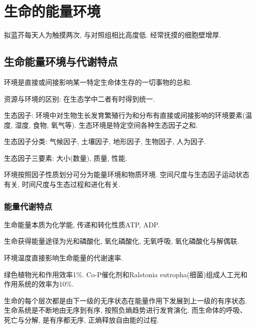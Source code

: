 \documentclass{ctexart}
\begin{document}
\section{生命的能量环境} %
\label{sec:生命的能量环境}

\begin{ex}[影响植物能量重新分配的实验]
    拟蓝芥每天人为触摸两次, 与对照组相比高度低. 经常抚摸的细胞壁增厚.
\end{ex}

\subsection{生命能量环境与代谢特点} %
\label{sub:生命能量环境与代谢特点}

环境是直接或间接影响某一特定生命体生存的一切事物的总和.
\par
资源与环境的区别: 在生态学中二者有时得到统一.
\par
生态因子: 环境中对生物生长发育繁殖行为和分布有直接或间接影响的环境要素(温度, 湿度, 食物, 氧气等). 生态环境是特定空间各种生态因子之和.
\par
生态因子分类: 气候因子, 土壤因子, 地形因子, 生物因子, 人为因子.
\par
生态因子三要素: 大小(数量), 质量, 性能.
\par
环境按照因子性质划分可分为能量环境和物质环境. 空间尺度与生态因子运动状态有关, 时间尺度与生态过程和进化有关.

\subsubsection{能量代谢特点} %
\label{ssub:能量代谢特点}

\begin{cenum}
    \item 生命能量本质为化学能, 传递和转化性质ATP, ADP.
    \item 生命获得能量途径为光和磷酸化, 氧化磷酸化, 无氧呼吸, 氧化磷酸化与解偶联.
    \item 环境温度直接影响生命能量的代谢速率.
    \item 绿色植物光和作用效率1\%. Co-P催化剂和Ralstonia eutropha(细菌)组成人工光和作用系统的效率为10\%.
\end{cenum}
\begin{remark}
    生命的每个层次都是由下一级的无序状态在能量作用下发展到上一级的有序状态. 生命系统是不断地由无序到有序, 按照负熵趋势进行发育演化. 而生命体的呼吸、死亡与分解, 是有序都无序, 正熵释放自由能的过程.
\end{remark}
\end{document}

